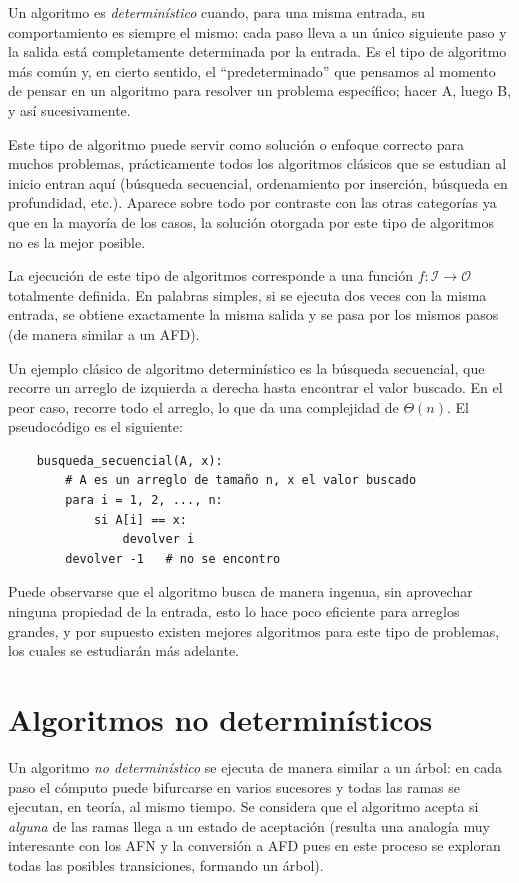 \documentclass[12pt,letterpaper]{article}
\begin{document}
Un algoritmo es \emph{determinístico} cuando, para una misma entrada, su 
comportamiento es siempre el mismo: cada paso lleva a un único siguiente paso 
y la salida está completamente determinada por la entrada. Es el tipo de 
algoritmo más común y, en cierto sentido, el ``predeterminado'' que pensamos al
momento de pensar en un algoritmo para resolver un problema específico; hacer A, 
luego B, y así sucesivamente.

Este tipo de algoritmo puede servir como solución o enfoque correcto para 
muchos problemas, prácticamente todos los algoritmos clásicos que se estudian 
al inicio entran aquí (búsqueda secuencial, ordenamiento por inserción, 
búsqueda en profundidad, etc.). Aparece sobre todo por contraste con las otras 
categorías ya que en la mayoría de los casos, la solución otorgada por este tipo 
de algoritmos no es la mejor posible.

La ejecución de este tipo de algoritmos corresponde a una función 
$f : \mathcal{I} \rightarrow \mathcal{O}$ totalmente definida. En palabras 
simples, si se ejecuta dos veces con la misma entrada, se obtiene exactamente 
la misma salida y se pasa por los mismos pasos (de manera similar a un AFD).

Un ejemplo clásico de algoritmo determinístico es la búsqueda secuencial, 
que recorre un arreglo de izquierda a derecha hasta encontrar el valor buscado. 
En el peor caso, recorre todo el arreglo, lo que da una complejidad de 
$\Theta(n)$. El pseudocódigo es el siguiente:

\begin{verbatim}
    busqueda_secuencial(A, x):
        # A es un arreglo de tamaño n, x el valor buscado
        para i = 1, 2, ..., n:
            si A[i] == x:
                devolver i
        devolver -1   # no se encontro
\end{verbatim}

Puede observarse que el algoritmo busca de manera ingenua, sin aprovechar 
ninguna propiedad de la entrada, esto lo hace poco eficiente para arreglos 
grandes, y por supuesto existen mejores algoritmos para este tipo de problemas,
los cuales se estudiarán más adelante.

\section{Algoritmos no determinísticos}
\label{sec:nodet}

Un algoritmo \emph{no determinístico} se ejecuta de manera similar a un árbol: 
en cada paso el cómputo puede bifurcarse en varios sucesores y todas las ramas 
se ejecutan, en teoría, al mismo tiempo. 
Se considera que el algoritmo acepta si \emph{alguna} de las ramas llega a un 
estado de aceptación (resulta una analogía muy interesante con los AFN y la 
conversión a AFD pues en este proceso se exploran todas las posibles 
transiciones, formando un árbol).
\end{document}
